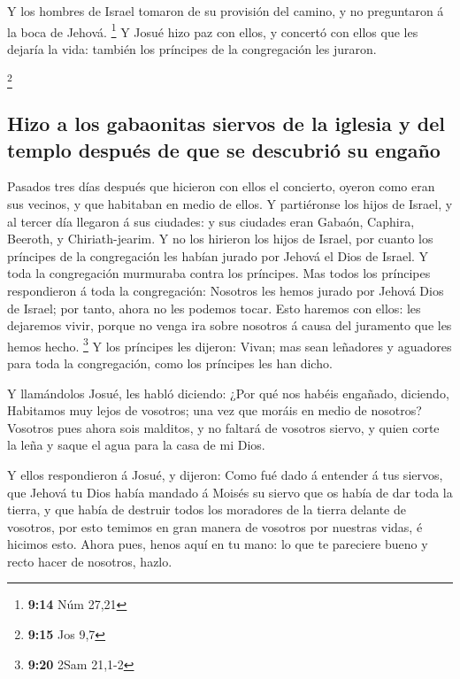  Y los hombres de Israel tomaron de su provisión del
camino, y no preguntaron á la boca de Jehová. \footnote{\textbf{9:14}
  Núm 27,21}  Y Josué hizo paz con ellos, y concertó con
ellos que les dejaría la vida: también los príncipes de la congregación
les juraron.

\footnote{\textbf{9:15} Jos 9,7}

\hypertarget{hizo-a-los-gabaonitas-siervos-de-la-iglesia-y-del-templo-despuuxe9s-de-que-se-descubriuxf3-su-engauxf1o}{%
\subsection{Hizo a los gabaonitas siervos de la iglesia y del templo
después de que se descubrió su
engaño}\label{hizo-a-los-gabaonitas-siervos-de-la-iglesia-y-del-templo-despuuxe9s-de-que-se-descubriuxf3-su-engauxf1o}}

 Pasados tres días después que hicieron con ellos el
concierto, oyeron como eran sus vecinos, y que habitaban en medio de
ellos.  Y partiéronse los hijos de Israel, y al tercer día
llegaron á sus ciudades: y sus ciudades eran Gabaón, Caphira, Beeroth, y
Chiriath-jearim.  Y no los hirieron los hijos de Israel,
por cuanto los príncipes de la congregación les habían jurado por Jehová
el Dios de Israel. Y toda la congregación murmuraba contra los
príncipes.  Mas todos los príncipes respondieron á toda la
congregación: Nosotros les hemos jurado por Jehová Dios de Israel; por
tanto, ahora no les podemos tocar.  Esto haremos con ellos:
les dejaremos vivir, porque no venga ira sobre nosotros á causa del
juramento que les hemos hecho. \footnote{\textbf{9:20} 2Sam 21,1-2}
 Y los príncipes les dijeron: Vivan; mas sean leñadores y
aguadores para toda la congregación, como los príncipes les han dicho.

 Y llamándolos Josué, les habló diciendo: ¿Por qué nos
habéis engañado, diciendo, Habitamos muy lejos de vosotros; una vez que
moráis en medio de nosotros?  Vosotros pues ahora sois
malditos, y no faltará de vosotros siervo, y quien corte la leña y saque
el agua para la casa de mi Dios.

 Y ellos respondieron á Josué, y dijeron: Como fué dado á
entender á tus siervos, que Jehová tu Dios había mandado á Moisés su
siervo que os había de dar toda la tierra, y que había de destruir todos
los moradores de la tierra delante de vosotros, por esto temimos en gran
manera de vosotros por nuestras vidas, é hicimos esto. 
Ahora pues, henos aquí en tu mano: lo que te pareciere bueno y recto
hacer de nosotros, hazlo.

